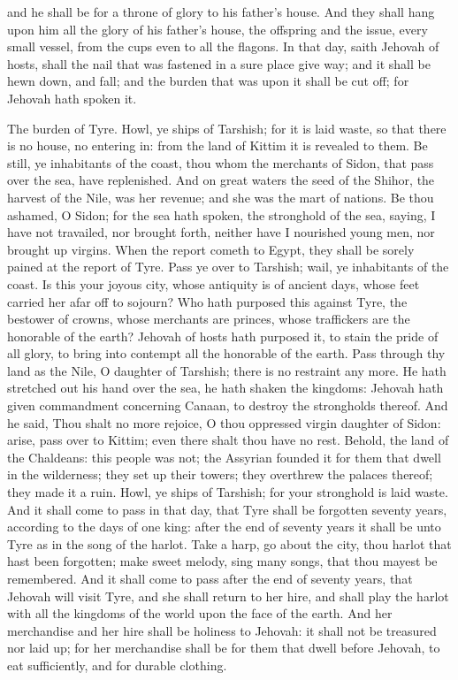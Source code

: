 and he shall be for a throne of glory to his father’s house. And they shall hang upon him all the glory of his father’s house, the offspring and the issue, every small vessel, from the cups even to all the flagons. In that day, saith Jehovah of hosts, shall the nail that was fastened in a sure place give way; and it shall be hewn down, and fall; and the burden that was upon it shall be cut off; for Jehovah hath spoken it. 

The burden of Tyre. Howl, ye ships of Tarshish; for it is laid waste, so that there is no house, no entering in: from the land of Kittim it is revealed to them. Be still, ye inhabitants of the coast, thou whom the merchants of Sidon, that pass over the sea, have replenished. And on great waters the seed of the Shihor, the harvest of the Nile, was her revenue; and she was the mart of nations. Be thou ashamed, O Sidon; for the sea hath spoken, the stronghold of the sea, saying, I have not travailed, nor brought forth, neither have I nourished young men, nor brought up virgins. When the report cometh to Egypt, they shall be sorely pained at the report of Tyre. Pass ye over to Tarshish; wail, ye inhabitants of the coast. Is this your joyous city, whose antiquity is of ancient days, whose feet carried her afar off to sojourn?  Who hath purposed this against Tyre, the bestower of crowns, whose merchants are princes, whose traffickers are the honorable of the earth? Jehovah of hosts hath purposed it, to stain the pride of all glory, to bring into contempt all the honorable of the earth. Pass through thy land as the Nile, O daughter of Tarshish; there is no restraint any more. He hath stretched out his hand over the sea, he hath shaken the kingdoms: Jehovah hath given commandment concerning Canaan, to destroy the strongholds thereof. And he said, Thou shalt no more rejoice, O thou oppressed virgin daughter of Sidon: arise, pass over to Kittim; even there shalt thou have no rest.  Behold, the land of the Chaldeans: this people was not; the Assyrian founded it for them that dwell in the wilderness; they set up their towers; they overthrew the palaces thereof; they made it a ruin. Howl, ye ships of Tarshish; for your stronghold is laid waste. And it shall come to pass in that day, that Tyre shall be forgotten seventy years, according to the days of one king: after the end of seventy years it shall be unto Tyre as in the song of the harlot. Take a harp, go about the city, thou harlot that hast been forgotten; make sweet melody, sing many songs, that thou mayest be remembered. And it shall come to pass after the end of seventy years, that Jehovah will visit Tyre, and she shall return to her hire, and shall play the harlot with all the kingdoms of the world upon the face of the earth. And her merchandise and her hire shall be holiness to Jehovah: it shall not be treasured nor laid up; for her merchandise shall be for them that dwell before Jehovah, to eat sufficiently, and for durable clothing. 

